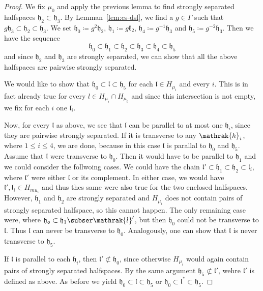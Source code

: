 \begin{proof}
  We fix \(\mu_0\) and apply the previous lemma to find strongly separated halfspaces \(\mathfrak{h_2} \subset \mathfrak{h_3}\). By Lemman~\ref{lem:cs-dsl}, we find a \(g \in \Gamma\) such that \(g\mathfrak{h}_3 \subset \mathfrak{h}_2 \subset \mathfrak{h}_3\). We set \(\mathfrak{h}_0 \coloneqq g^2 \mathfrak{h}_2\), \(\mathfrak{h}_1 \coloneqq g\mathfrak{k}_2\), \(\mathfrak{h}_4 \coloneqq g^{-1}\mathfrak{h}_3\) and \(\mathfrak{h}_5 \coloneqq g^{-2} \mathfrak{h}_3\). Then we have the sequence
  \[
    \mathfrak{h}_0 \subset \mathfrak{h}_1 \subset \mathfrak{h}_2 \subset \mathfrak{h}_3 \subset \mathfrak{h}_4 \subset \mathfrak{h}_5
  \]
  and since \(\mathfrak{h}_2\) and \(\mathfrak{h}_3\) are strongly separated, we can show that all the above halfspaces are pairwise strongly separated.

  We would like to show that \(\mathfrak{h}_0 \subset \mathfrak{l} \subset \mathfrak{h}_5\) for each \(\mathfrak{l} \in H_{\mu_i}\) and every \(i\). This is in fact already true for every \(l \in H_{\mu_i} \cap H_{\mu_0}\) and since this intersection is not empty, we fix for each \(i\) one \(\mathfrak{l}_i\).

  Now, for every \(\mathfrak{l}\) as above, we see that \(\mathfrak{l}\) can be parallel to at most one \(\mathfrak{h}_i\), since they are pairwise strongly separated. If it is transverse to any \(\mathrak{h}_i\), where \(1 \leq i \leq 4\), we are done, because in this case \(\mathfrak{l}\) is parallal to \(\mathfrak{h}_0\) and \(\mathfrak{h}_5\). Assume that \(\mathfrak{l}\) were transverse to \(\mathfrak{h}_0\). Then it would have to be parallel to \(\mathfrak{h}_1\) and we could consider the follwoing cases. We could have the chain \(\mathfrak{l}' \subset \mathfrak{h}_1 \subset \mathfrak{h}_2 \subset \mathfrak{l}_i\), where \(\mathfrak{l}'\) were either \(\mathfrak{l}\) or its complement. In either case, we would have \(\mathfrak{l}', \mathfrak{l}_i \in H_{mu_i}\) and thus thes same were also true for the two enclosed halfspaces. However, \(\mathfrak{h}_1\) and \(\mathfrak{h}_2\) are strongly separated and \(H_{\mu_i}\) does not contain pairs of strongly separated halfspace, so this cannot happen. The only remaining case were, where \(\mathfrak{h_0} \subset \mathfrak{h}_1 \subser \mathrak{l}'\), but then \(\mathfrak{h}_0\) could not be transverse to \(\mathfrak{l}\). Thus \(\mathfrak{l}\) can never be transverse to \(\mathfrak{h}_0\). Analogously, one can show that \(\mathfrak{l}\) is never transverse to \(\mathfrak{h}_5\).

  If \(\mathfrak{l}\) is parallel to each \(\mathfrak{h}_i\), then \(\mathfrak{l}' \not\subset \mathfrak{h_0}\), since otherwise \(H_{\mu_i}\) would again contain pairs of strongly separated halfspaces. By the same argument \(\mathfrak{h}_5 \not\subset \mathfrak{l}'\), wehre \(\mathfrak{l}'\) is defined as above. As before we yield \(\mathfrak{h}_0 \subset \mathfrak{l} \subset \mathfrak{h}_5\) or \(\mathfrak{h}_0 \subset \mathfrak{l}^\ast \subset \mathfrak{h}_5\).
\end{proof}

